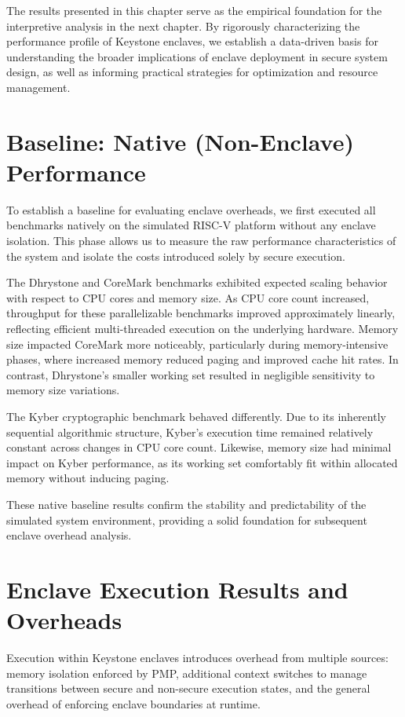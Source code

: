 The results presented in this chapter serve as the empirical foundation for the interpretive analysis in the next chapter. By rigorously characterizing the performance profile of Keystone enclaves, we establish a data-driven basis for understanding the broader implications of enclave deployment in secure system design, as well as informing practical strategies for optimization and resource management.

\section{Baseline: Native (Non-Enclave) Performance}

To establish a baseline for evaluating enclave overheads, we first executed all benchmarks natively on the simulated RISC-V platform without any enclave isolation. This phase allows us to measure the raw performance characteristics of the system and isolate the costs introduced solely by secure execution.

The Dhrystone and CoreMark benchmarks exhibited expected scaling behavior with respect to CPU cores and memory size. As CPU core count increased, throughput for these parallelizable benchmarks improved approximately linearly, reflecting efficient multi-threaded execution on the underlying hardware. Memory size impacted CoreMark more noticeably, particularly during memory-intensive phases, where increased memory reduced paging and improved cache hit rates. In contrast, Dhrystone’s smaller working set resulted in negligible sensitivity to memory size variations.

The Kyber cryptographic benchmark behaved differently. Due to its inherently sequential algorithmic structure, Kyber’s execution time remained relatively constant across changes in CPU core count. Likewise, memory size had minimal impact on Kyber performance, as its working set comfortably fit within allocated memory without inducing paging.

These native baseline results confirm the stability and predictability of the simulated system environment, providing a solid foundation for subsequent enclave overhead analysis.

\section{Enclave Execution Results and Overheads}

Execution within Keystone enclaves introduces overhead from multiple sources: memory isolation enforced by PMP, additional context switches to manage transitions between secure and non-secure execution states, and the general overhead of enforcing enclave boundaries at runtime.

